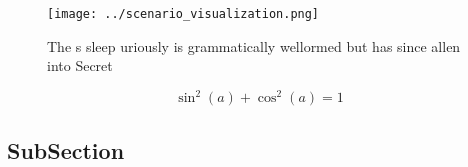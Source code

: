 \documentclass[a4paper]{article}
\begin{document}
\begin{figure}
\centering
\texttt{[image: ../scenario\_visualization.png]}
\caption{The s sleep uriously is grammatically wellormed but has since allen into Secret
}
\end{figure}
 
\[ \sin^2(a)+\cos^2(a) = 1 \]

\subsection{SubSection}
\end{document}
